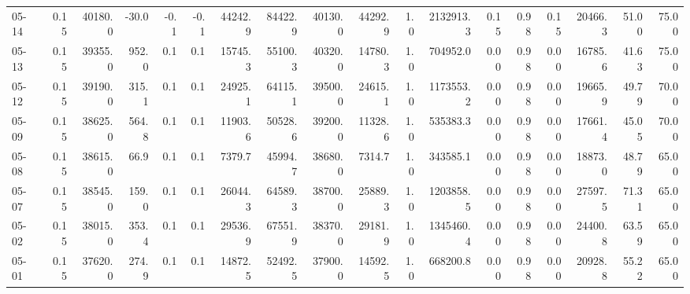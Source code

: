 \begin{threeparttable}
{\begin{tabular}{lrrrrrrrrrrrrrrrrr}
  05-14 &     0.15 & 40180.0 &             -30.0 &              -0.1 &               -0.1 &            44242.9 & 84422.9 & 40130.0 &    44292.9 &                      1.0 &           2132913.3 &       0.15 &      0.98 &           0.15 &          20466.3 &           51.00 &                  75.00 \\
  05-13 &     0.15 & 39355.0 &             952.0 &               0.1 &                0.1 &            15745.3 & 55100.3 & 40320.0 &    14780.3 &                      1.0 &            704952.0 &       0.00 &      0.98 &           0.00 &          16785.6 &           41.63 &                  75.00 \\
  05-12 &     0.15 & 39190.0 &             315.1 &               0.1 &                0.1 &            24925.1 & 64115.1 & 39500.0 &    24615.1 &                      1.0 &           1173553.2 &       0.00 &      0.98 &           0.00 &          19665.9 &           49.79 &                  70.00 \\
  05-09 &     0.15 & 38625.0 &             564.8 &               0.1 &                0.1 &            11903.6 & 50528.6 & 39200.0 &    11328.6 &                      1.0 &            535383.3 &       0.00 &      0.98 &           0.00 &          17661.4 &           45.05 &                  70.00 \\
  05-08 &     0.15 & 38615.0 &              66.9 &               0.1 &                0.1 &             7379.7 & 45994.7 & 38680.0 &     7314.7 &                      1.0 &            343585.1 &       0.00 &      0.98 &           0.00 &          18873.0 &           48.79 &                  65.00 \\
  05-07 &     0.15 & 38545.0 &             159.0 &               0.1 &                0.1 &            26044.3 & 64589.3 & 38700.0 &    25889.3 &                      1.0 &           1203858.5 &       0.00 &      0.98 &           0.00 &          27597.5 &           71.31 &                  65.00 \\
  05-02 &     0.15 & 38015.0 &             353.4 &               0.1 &                0.1 &            29536.9 & 67551.9 & 38370.0 &    29181.9 &                      1.0 &           1345460.4 &       0.00 &      0.98 &           0.00 &          24400.8 &           63.59 &                  65.00 \\
  05-01 &     0.15 & 37620.0 &             274.9 &               0.1 &                0.1 &            14872.5 & 52492.5 & 37900.0 &    14592.5 &                      1.0 &            668200.8 &       0.00 &      0.98 &           0.00 &          20928.8 &           55.22 &                  65.00 \\

\end{tabular}}
\end{threeparttable}
